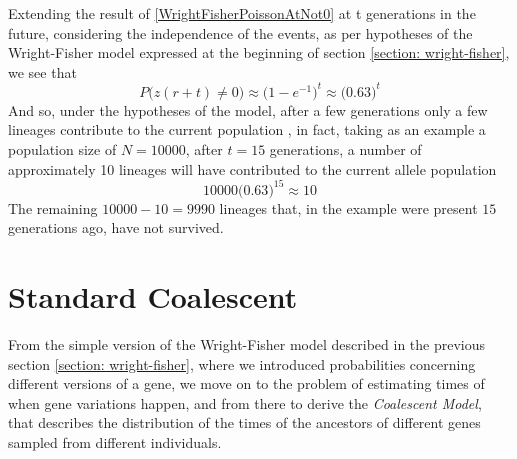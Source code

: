 \documentclass[12pt,mythesisstyle]{report}
\begin{document}
Extending the result of \eqref{WrightFisherPoissonAtNot0} at t generations in the future, considering the independence of the events, as per hypotheses of the Wright-Fisher model expressed at the beginning of section \ref{section: wright-fisher}, we see that
\begin{equation}\label{WrightFisherPoissonAtfuture}
P\big(z(r+t) \neq 0\big) \approx \big(1- e^{-1}\big)^t \approx \big(0.63\big)^t
\end{equation}
And so, under the hypotheses of the model, after a few generations only a few lineages contribute to the current population \cite{coalescentPrimer}, in fact, taking as an example a population size of $N=10000$, after $t=15$ generations, a number of approximately 10 lineages will have contributed to the current allele population
\begin{equation}\label{exampleWrightFisher}
10000\big(0.63\big)^{15} \approx 10
\end{equation}
The remaining $10000-10=9990$ lineages that, in the example were present $15$ generations ago, have not survived.

\section{Standard Coalescent}\label{section: coalescent}
From the simple version of the Wright-Fisher model described in the previous section \ref{section: wright-fisher}, where we introduced probabilities concerning different versions of a gene, we move on to the problem of estimating times of when gene variations happen, and from there to derive the \textit{Coalescent Model}, that describes the distribution of the times of the ancestors of different genes sampled from different individuals.
\end{document}
